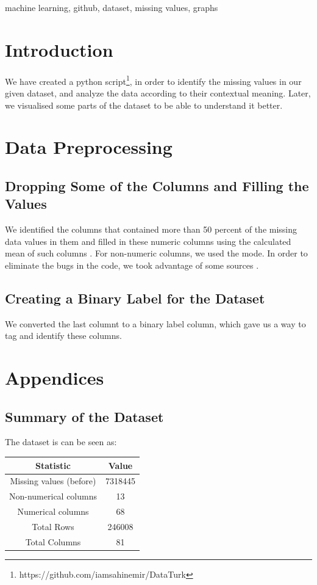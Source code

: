 \documentclass[a4paper, conference]{IEEEtran} %
\begin{document}
\begin{IEEEkeywords}
machine learning, github, dataset, missing values, graphs
\end{IEEEkeywords}

\section{Introduction}
We have created a python script\footnote{https://github.com/iamsahinemir/DataTurk}, in order to identify the missing values in our given dataset, and
analyze the data according to their contextual meaning.
Later, we visualised some parts of the dataset to be able to understand it better.
\section{Data Preprocessing}

\subsection{Dropping Some of the Columns and Filling the Values}

We identified the columns that contained more than 50 percent of the missing data values in them and filled in these
 numeric columns using the calculated mean of such columns \cite{kaggle}.
For non-numeric columns, we used the mode. In order to eliminate the bugs in the code, we took advantage of some
 sources \cite{gunes} \cite{akademi} \cite{chatgpt}.

\subsection{Creating a Binary Label for the Dataset}
We converted the last columnt to a binary label column, which gave us a way to tag and identify these columns. 
\section{Appendices}
\subsection{Summary of the Dataset}
The dataset is can be seen as:
\begin{center}
\begin{tabular}{ |c|c| }
    \hline
    \textbf{Statistic} & \textbf{Value} \\
    \hline
    Missing values (before) & 7318445 \\    
    \hline
    Non-numerical columns & 13 \\
    \hline
    Numerical columns & 68 \\
    \hline
    Total Rows & 246008 \\
    \hline
    Total Columns & 81 \\
    \hline
\end{tabular}
\end{center}
\end{document}
